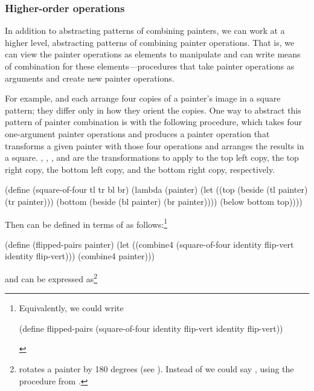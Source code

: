 \subsubsection*{Higher-order operations}

In addition to abstracting patterns of combining painters, we can work at a
higher level, abstracting patterns of combining painter operations.  That is,
we can view the painter operations as elements to manipulate and can write
means of combination for these elements---procedures that take painter
operations as arguments and create new painter operations.

For example,  and  each arrange four
copies of a painter's image in a square pattern; they differ only in how they
orient the copies.  One way to abstract this pattern of painter combination is
with the following procedure, which takes four one-argument painter operations
and produces a painter operation that transforms a given painter with those
four operations and arranges the results in a square.  , ,
, and  are the transformations to apply to the top left copy,
the top right copy, the bottom left copy, and the bottom right copy,
respectively.

\begin{codeBlock}
(define (square-of-four tl tr bl br)
  (lambda (painter)
    (let ((top (beside (tl painter) (tr painter)))
          (bottom (beside (bl painter) (br painter))))
      (below bottom top))))
\end{codeBlock}

\noindent
Then  can be defined in terms of  as
follows:\footnote{Equivalently, we could write

\begin{compactCodeBlock}
(define flipped-pairs
  (square-of-four identity flip-vert identity flip-vert))
\end{compactCodeBlock}
}

\begin{codeBlock}
(define (flipped-pairs painter)
  (let ((combine4 (square-of-four identity flip-vert
                                  identity flip-vert)))
    (combine4 painter)))
\end{codeBlock}

\noindent
and  can be expressed as\footnote{ rotates a
painter by 180 degrees (see ).  Instead of 
we could say , using the 
procedure from .}

